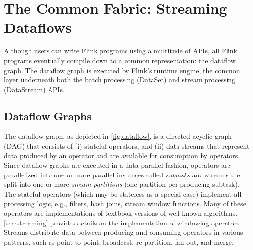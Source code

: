 \documentclass[11pt]{article}
\begin{document}
\vspace{-3mm}
\section{The Common Fabric: Streaming Dataflows}
\label{sec:execution}

Although users can write Flink programs using a multitude of APIs, all Flink programs eventually compile down to a common representation: the dataflow graph. The dataflow graph is executed by Flink's runtime engine, the common layer underneath both the batch processing (DataSet) and stream processing (DataStream) APIs.

\vspace{-2mm}
\subsection{Dataflow Graphs}
The dataflow graph, as depicted in \autoref{fig:dataflow}, is a directed acyclic graph (DAG) that consists of (i) stateful operators, and (ii) data streams that represent data produced by an operator and are available for consumption by operators. Since dataflow graphs are executed in a data-parallel fashion, operators are parallelized into one or more parallel instances called \emph{subtasks} and streams are split into one or more \emph{stream partitions} (one partition per producing subtask). 
The stateful operators (which may be stateless as a special case) implement all processing logic, e.g., filters, hash joins, stream window functions. Many of these operators are implementations of textbook versions of well known algorithms. \autoref{sec:streaming} provides details on the implementation of windowing operators. Streams distribute data between producing and consuming operators in various patterns, such as point-to-point, broadcast, re-partition, fan-out, and merge.
\end{document}
